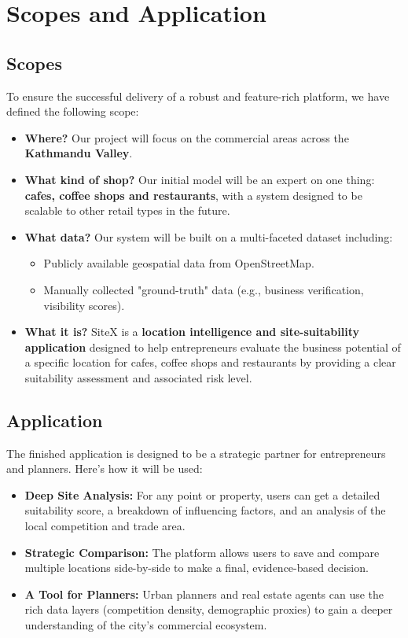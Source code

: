 \section{Scopes and Application}

\subsection{Scopes}

To ensure the successful delivery of a robust and feature-rich platform, we have defined the following scope:
\begin{itemize}
	\item \textbf{Where?} Our project will focus on the commercial areas across the \textbf{Kathmandu Valley}.
	\item \textbf{What kind of shop?} Our initial model will be an expert on one thing: \textbf{cafes, coffee shops and restaurants}, with a system designed to be scalable to other retail types in the future.
	\item \textbf{What data?} Our system will be built on a multi-faceted dataset including:
	      \begin{itemize}
		      \item Publicly available geospatial data from OpenStreetMap.
		      \item Manually collected "ground-truth" data (e.g., business verification, visibility scores).
	      \end{itemize}
			\item \textbf{What it is?} SiteX is a \textbf{location intelligence and site-suitability application} designed to help entrepreneurs evaluate the business potential of a specific location for cafes, coffee shops and restaurants by providing a clear suitability assessment and associated risk level.

\end{itemize}

\subsection{Application}

The finished application is designed to be a strategic partner for entrepreneurs and planners. Here’s how it will be used:
\begin{itemize}
 
    \item \textbf{Deep Site Analysis:} For any point or property, users can get a detailed suitability score, a breakdown of influencing factors, and an analysis of the local competition and trade area.
    \item \textbf{Strategic Comparison:} The platform allows users to save and compare multiple locations side-by-side to make a final, evidence-based decision.
    \item \textbf{A Tool for Planners:} Urban planners and real estate agents can use the rich data layers (competition density, demographic proxies) to gain a deeper understanding of the city's commercial ecosystem.
\end{itemize}

